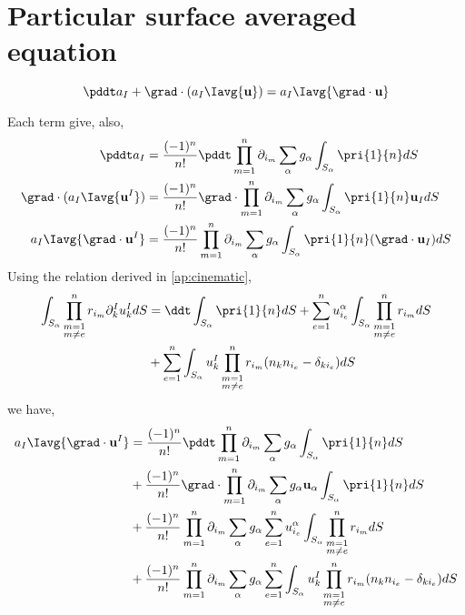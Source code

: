 \section{Particular surface averaged equation}
\begin{equation}
    \pddt a_I
    + \grad \cdot \left(
        a_I
        \Iavg{\textbf{u}}
    \right)
    = a_I \Iavg{\grad \cdot \textbf{u}}
\end{equation}

Each term give,
also, 
\begin{align*}
    \pddt a_I &= \frac{(-1)^{n}}{n!}
        \pddt
        \prod^{n}_{m=1}
        \partial_{i_m}
        \sum_{\alpha}
        g_{\alpha}
        \int_{S_\alpha}
        \pri{1}{n}dS \\
    \grad \cdot (a_I \Iavg{\textbf{u}^I}) &= \frac{(-1)^{n}}{n!}
        \grad\cdot\prod^{n}_{m=1}
        \partial_{i_m}
        \sum_{\alpha}
        g_{\alpha}
        \int_{S_\alpha}
        \pri{1}{n} \textbf{u}_IdS\\
    a_I \Iavg{\grad \cdot \textbf{u}^I} &= \frac{(-1)^{n}}{n!}
        \prod^{n}_{m=1}
        \partial_{i_m}
        \sum_{\alpha}
        g_{\alpha}
        \int_{S_\alpha}
        \pri{1}{n} (\grad \cdot \textbf{u}_I)dS\\
\end{align*}
Using the relation derived in \ref{ap:cinematic}, 
\begin{align*}
    \int_{S_\alpha} 
    \prod_{\substack{m = 1 \\m \neq e}}^{n} r_{i_m}
    \partial_k^I u^I_k dS 
    &=
    \ddt \int_{S_\alpha} \pri{1}{n}dS
    + \sum_{e=1}^n u^\alpha_{i_e} \int_{S_\alpha} 
    \prod_{\substack{m = 1 \\m \neq e}}^{n} r_{i_m}dS \\
    &+ \sum_{e=1}^n \int_{S_\alpha} u^I_k
    \prod_{\substack{m = 1 \\m \neq e}}^{n} r_{i_m}
    (n_kn_{i_e} - \delta_{ki_e}) dS \\
\end{align*}
we have,
\begin{align*}
    a_I \Iavg{\grad \cdot \textbf{u}^I} 
    &= \frac{(-1)^{n}}{n!}
    \pddt 
    \prod^{n}_{m=1}
    \partial_{i_m}
    \sum_{\alpha}
    g_{\alpha} 
    \int_{S_\alpha} \pri{1}{n}dS \\
    &+ \frac{(-1)^{n}}{n!}
    \grad \cdot
    \prod^{n}_{m=1}
    \partial_{i_m}
    \sum_{\alpha}
    g_{\alpha} 
     \textbf{u}_\alpha \int_{S_\alpha} \pri{1}{n}dS \\
    & + \frac{(-1)^{n}}{n!}
    \prod^{n}_{m=1}
    \partial_{i_m}
    \sum_{\alpha}
    g_{\alpha} 
    \sum_{e=1}^n u^\alpha_{i_e} \int_{S_\alpha} 
    \prod_{\substack{m = 1 \\m \neq e}}^{n} r_{i_m}dS \\
    & +  \frac{(-1)^{n}}{n!}
    \prod^{n}_{m=1}
    \partial_{i_m}
    \sum_{\alpha}
    g_{\alpha} 
    \sum_{e=1}^n \int_{S_\alpha} u^I_k
    \prod_{\substack{m = 1 \\m \neq e}}^{n} r_{i_m}
    (n_kn_{i_e} - \delta_{ki_e}) dS
\end{align*}
